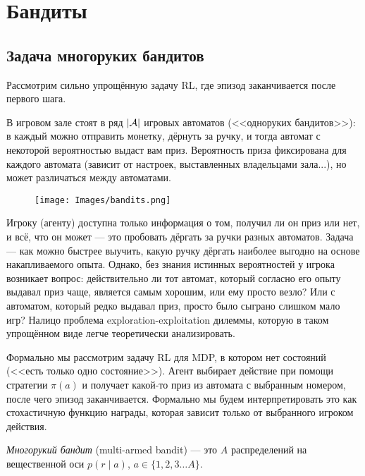 
\section{Бандиты}\label{sec:bandistssection}

\subsection{Задача многоруких бандитов}

Рассмотрим сильно упрощённую задачу RL, где эпизод заканчивается после первого шага.

\begin{example}
В игровом зале стоят в ряд $|\mathcal{A}|$ игровых автоматов (<<одноруких бандитов>>): в каждый можно отправить монетку, дёрнуть за ручку, и тогда автомат с некоторой вероятностью выдаст вам приз. Вероятность приза фиксирована для каждого автомата (зависит от настроек, выставленных владельцами зала...), но может различаться между автоматами. 

\begin{wrapfigure}{r}{0.25\textwidth}
\vspace{-0.6cm}
\centering
\texttt{[image: Images/bandits.png]}
\vspace{-0.3cm}
\end{wrapfigure}

Игроку (агенту) доступна только информация о том, получил ли он приз или нет, и всё, что он может --- это пробовать дёргать за ручки разных автоматов. Задача --- как можно быстрее выучить, какую ручку дёргать наиболее выгодно на основе накапливаемого опыта. Однако, без знания истинных вероятностей у игрока возникает вопрос: действительно ли тот автомат, который согласно его опыту выдавал приз чаще, является самым хорошим, или ему просто везло? Или с автоматом, который редко выдавал приз, просто было сыграно слишком мало игр? Налицо проблема exploration-exploitation дилеммы, которую в таком упрощённом виде легче теоретически анализировать.
\end{example}

Формально мы рассмотрим задачу RL для MDP, в котором нет состояний (<<есть только одно состояние>>). Агент выбирает действие при помощи стратегии $\pi(a)$ и получает какой-то приз из автомата с выбранным номером, после чего эпизод заканчивается. Формально мы будем интерпретировать это как стохастичную функцию награды, которая зависит только от выбранного игроком действия.

\begin{definition}
\emph{Многорукий бандит} (multi-armed bandit) --- это $A$ распределений на вещественной оси $p(r \mid a)$, $a \in \{1,2,3 \dots A\}$.
\end{definition}

